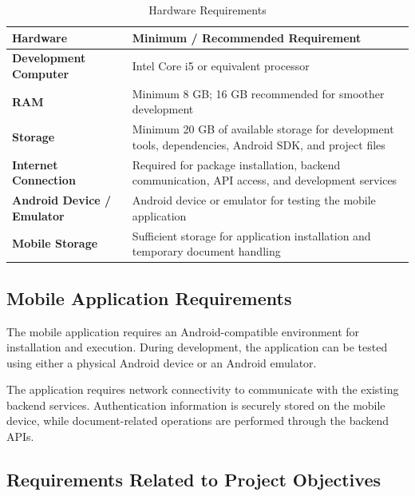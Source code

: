 \documentclass[12pt]{article}
\begin{document}
\begin{table}[h]
\centering
\caption{Hardware Requirements}
\label{tab:hardware_requirements}
\renewcommand{\arraystretch}{1.3}
\begin{tabular}{|p{4cm}|p{9cm}|}
\hline
\textbf{Hardware} & \textbf{Minimum / Recommended Requirement} \\ \hline

\textbf{Development Computer} & Intel Core i5 or equivalent processor \\ \hline

\textbf{RAM} & Minimum 8 GB; 16 GB recommended for smoother development \\ \hline

\textbf{Storage} & Minimum 20 GB of available storage for development tools, dependencies, Android SDK, and project files \\ \hline

\textbf{Internet Connection} & Required for package installation, backend communication, API access, and development services \\ \hline

\textbf{Android Device / Emulator} & Android device or emulator for testing the mobile application \\ \hline

\textbf{Mobile Storage} & Sufficient storage for application installation and temporary document handling \\ \hline

\end{tabular}
\end{table}

\subsection{Mobile Application Requirements}

The mobile application requires an Android-compatible environment for installation and execution. During development, the application can be tested using either a physical Android device or an Android emulator.

The application requires network connectivity to communicate with the existing backend services. Authentication information is securely stored on the mobile device, while document-related operations are performed through the backend APIs.

\subsection{Requirements Related to Project Objectives}
\end{document}
